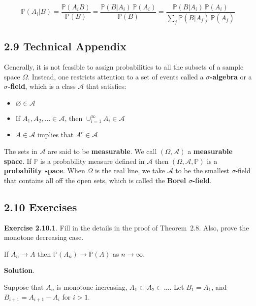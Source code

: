 \[ 
\mathbb{P}(A_{i} | B) 
= \frac{\mathbb{P}(A_{i} B) }{\mathbb{P}(B)} 
= \frac{\mathbb{P}(B | A_{i}) \, \mathbb{P}(A_{i})}{\mathbb{P}(B)} 
= \frac{\mathbb{P}(B | A_{i}) \, \mathbb{P}(A_{i})}{\sum_{j} \mathbb{P}(B | A_{j}) \, \mathbb{P}(A_{j})}
\]

\subsection*{2.9 Technical Appendix}

Generally, it is not feasible to assign probabilities to all the subsets of a sample space \(\Omega\). Instead, one restricts attention to a set of events called a \textbf{\(\sigma\)-algebra} or a \textbf{\(\sigma\)-field}, which is a class \(\mathcal{A}\) that satisfies:

\begin{itemize}[tightlist]
\item
  \(\varnothing \in \mathcal{A}\)
\item
  If \(A_{1}, A_{2}, \dots \in \mathcal{A}\), then
  \(\cup_{i=1}^{\infty} A_{i} \in \mathcal{A}\)
\item
  \(A \in \mathcal{A}\) implies that \(A^{c} \in \mathcal{A}\)
\end{itemize}

The sets in \(\mathcal{A}\) are said to be \textbf{measurable}. We call \((\Omega, \mathcal{A})\) a \textbf{measurable space}. If \(\mathbb{P}\) is a probability measure defined in \(\mathcal{A}\) then \((\Omega, \mathcal{A}, \mathbb{P})\) is a \textbf{probability space}. When \(\Omega\) is the real line, we take \(\mathcal{A}\) to be the smallest \(\sigma\)-field that contains all off the open sets, which is called the \textbf{Borel \(\sigma\)-field}.

\subsection*{2.10 Exercises}

\textbf{Exercise 2.10.1}. Fill in the details in the proof of Theorem~2.8. Also, prove the monotone decreasing case.

If \(A_{n} \rightarrow A\) then \(\mathbb{P}(A_{n}) \rightarrow \mathbb{P}(A)\) as \(n \rightarrow \infty\).

\textbf{Solution}.

Suppose that \(A_{n}\) is monotone increasing, \(A_{1} \subset A_{2} \subset \dots\). Let \(B_{1} = A_{1}\), and \(B_{i+1} = A_{i+1} - A_{i}\) for \(i > 1\).

